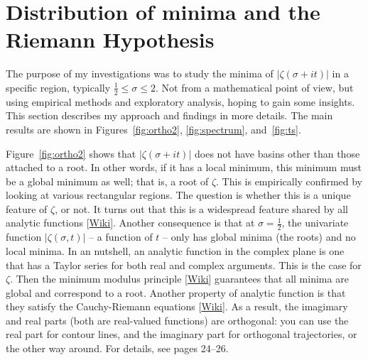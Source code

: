 \documentclass[oneside,10pt]{book}
\begin{document}
\section{Distribution of minima and the Riemann Hypothesis}\label{po0xz}

The purpose of my investigations was to study the minima of
 $|\zeta(\sigma+it)|$ in a specific region, typically $\frac{1}{2}\leq \sigma \leq 2$. Not from a mathematical point of view, but using empirical methods and exploratory analysis, hoping to gain some insights. This section describes my approach and findings in more details.
 The main results are shown in Figures~\ref{fig:ortho2}, \ref{fig:spectrum}, and~\ref{fig:ts}.

Figure~\ref{fig:ortho2} shows that $|\zeta(\sigma+it)|$ does not have basins other than those attached to a root. In other words, if it has a local minimum, this minimum must be a global minimum as well; that is, a root of $\zeta$. This is empirically confirmed by looking at various rectangular regions. The question is whether this is a unique feature of $\zeta$, or not. It turns out that this is a widespread feature shared  by all \textcolor{index}{analytic functions} [\href{https://en.wikipedia.org/wiki/Analytic_function}{Wiki}]. Another consequence is that at $\sigma=\frac{1}{2}$, the univariate function $|\zeta(\sigma,t)|$ -- a function of $t$ -- only has global minima (the roots) and no local minima. In an nutshell, an analytic function in the complex plane is one that has a Taylor series for both real and complex arguments. This is the case for $\zeta$. Then the
\textcolor{index}{minimum modulus principle} [\href{https://en.wikipedia.org/wiki/Maximum_modulus_principle}{Wiki}] guarantees that all minima are global and correspond to a root. Another property of analytic function is
 that they satisfy the \textcolor{index}{Cauchy-Riemann equations} [\href{https://en.wikipedia.org/wiki/Cauchy\%E2\%80\%93Riemann_equations}{Wiki}]. As a result, the imagimary and real parts (both are real-valued functions) are orthogonal: you can use the real part for contour lines, and the imaginary part for orthogonal trajectories, or the other way around. For details, see
 \cite{conformalmap} pages 24--26.
\end{document}
